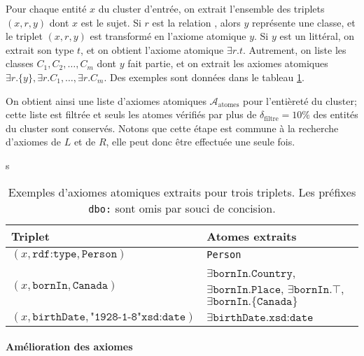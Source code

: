 Pour chaque entité $x$ du cluster d'entrée, on extrait l'ensemble des triplets $(x, r, y)$ dont $x$ est le sujet. Si $r$ est la relation , alors $y$ représente une classe, et le triplet $(x, r, y)$ est transformé en l'axiome atomique $y$. Si $y$ est un littéral, on extrait son type $t$, et on obtient l'axiome atomique $\exists r.t$. Autrement, on liste les classes $C_1, C_2, \ldots, C_m$ dont $y$ fait partie, et on extrait les axiomes atomiques $\exists r.\{y\}, \exists r.C_1, \ldots, \exists r.C_m$. Des exemples sont données dans le tableau \ref{tab:texp-atom-examples}.

On obtient ainsi une liste d'axiomes atomiques $\mathcal{A}_\text{atomes}$ pour l'entièreté du cluster; cette liste est filtrée et seuls les atomes vérifiés par plus de $\delta_\text{filtre} = 10\%$ des entités du cluster sont conservés. Notons que cette étape est commune à la recherche d'axiomes de $L$ et de $R$, elle peut donc être effectuée une seule fois.


\begin{table}[h]
    \centering
    \caption[Extraction d'atomes atomiques à partir de triplets]{Exemples d'axiomes atomiques extraits pour trois triplets. Les préfixes \texttt{dbo:} sont omis par souci de concision.}s
    \begin{tabularx}{\textwidth}{|l|X|}
         \hline 
         Triplet & Atomes extraits \\
         \hline
         $(x, \texttt{rdf:type}, \texttt{Person})$ &  \texttt{Person} \\
         \hline 
         $(x, \texttt{bornIn}, \texttt{Canada})$ & 
         $\exists \texttt{bornIn}. \allowbreak \texttt{Country}$,  \newline
         $\exists \texttt{bornIn}. \allowbreak \texttt{Place}$, \newline
         $\exists \texttt{bornIn}. \allowbreak \top$,  \newline
         $\exists \texttt{bornIn}. \allowbreak \{\texttt{Canada} \}$ \\
         \hline 
         $(x, \texttt{birthDate}, \texttt{"1928-1-8"xsd:date})$ & $\exists \texttt{birthDate}. \allowbreak \texttt{xsd:date}$ \\
         \hline 
    \end{tabularx}
    \label{tab:texp-atom-examples}
\end{table}
\paragraph{Amélioration des axiomes}

